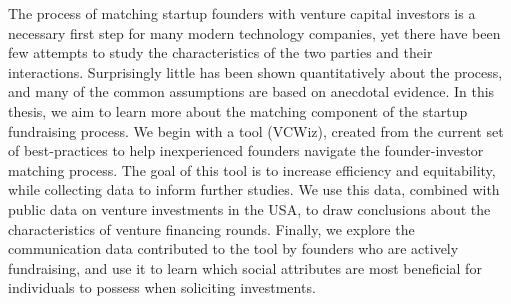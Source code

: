 %
%
%
The process of matching startup founders with venture capital investors is a necessary first step for many modern technology companies, yet there have been few attempts to study the characteristics of the two parties and their interactions. Surprisingly little has been shown quantitatively about the process, and many of the common assumptions are based on anecdotal evidence. In this thesis, we aim to learn more about the matching component of the startup fundraising process. We begin with a tool (VCWiz), created from the current set of best-practices to help inexperienced founders navigate the founder-investor matching process. The goal of this tool is to increase efficiency and equitability, while collecting data to inform further studies. We use this data, combined with public data on venture investments in the USA, to draw conclusions about the characteristics of venture financing rounds. Finally, we explore the communication data contributed to the tool by founders who are actively fundraising, and use it to learn which social attributes are most beneficial for individuals to possess when soliciting investments.
